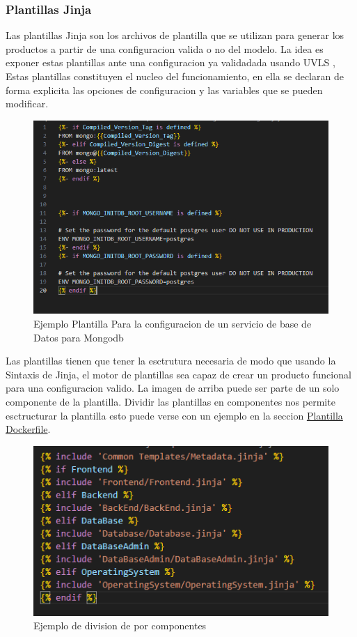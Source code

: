 \documentclass[12pt, a4paper, twoside]{article}
\begin{document}
\subsubsection{Plantillas Jinja}
Las plantillas Jinja son los archivos de plantilla que se utilizan para generar los productos a partir de una configuracion valida o no del modelo.
La idea es exponer estas plantillas ante una configuracion ya validadada usando UVLS \cite{uvls_code}, Estas plantillas constituyen el nucleo del funcionamiento, en ella se declaran de forma explicita las opciones de configuracion y las variables que se pueden modificar.
\newpage
\begin{figure}[h]
	\centering
		\includegraphics[width=1\textwidth]{jinja_template_database_mongodb.png}
	\caption{Ejemplo Plantilla Para la configuracion de un servicio de base de Datos para Mongodb}
\end{figure}

Las plantillas tienen que tener la esctrutura necesaria de modo que usando la Sintaxis de Jinja, el motor de plantillas sea capaz de crear un producto funcional para una configuracion valido. La imagen de arriba puede ser parte de un solo componente de la plantilla.
Dividir las plantillas en componentes nos permite esctructurar la plantilla esto puede verse con un ejemplo en la seccion \hyperref[sec:Plantilla dockerfile]{Plantilla Dockerfile}.

\begin{figure}[h]
	\centering
		\includegraphics[width=1\textwidth]{dockerfile.logica.plantillas.jinja.png}
	\caption{Ejemplo de division de por componentes}
\end{figure}
\end{document}
